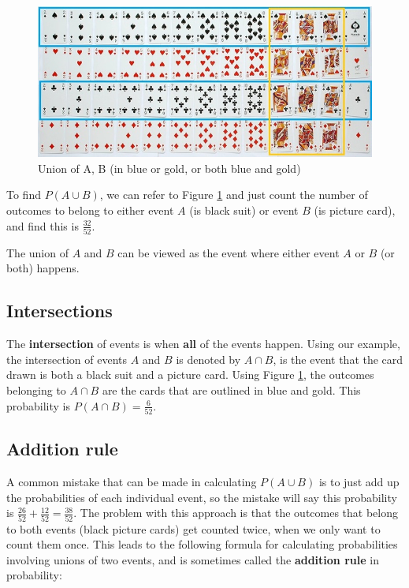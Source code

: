 \documentclass[
]{book}
\begin{document}
\begin{figure}
\centering
\includegraphics{images/02-cardsAB.jpg}
\caption{\label{fig:cardsAB}Union of A, B (in blue or gold, or both blue and gold)}
\end{figure}

To find \(P(A \cup B)\), we can refer to Figure \ref{fig:cardsAB} and just count the number of outcomes to belong to either event \(A\) (is black suit) or event \(B\) (is picture card), and find this is \(\frac{32}{52}\).

The union of \(A\) and \(B\) can be viewed as the event where either event \(A\) or \(B\) (or both) happens.

\subsection{Intersections}\label{intersections}

The \textbf{intersection} of events is when \textbf{all} of the events happen. Using our example, the intersection of events \(A\) and \(B\) is denoted by \(A \cap B\), is the event that the card drawn is both a black suit and a picture card. Using Figure \ref{fig:cardsAB}, the outcomes belonging to \(A \cap B\) are the cards that are outlined in blue and gold. This probability is \(P(A \cap B) = \frac{6}{52}\).

\subsection{Addition rule}\label{addition-rule}

A common mistake that can be made in calculating \(P(A \cup B)\) is to just add up the probabilities of each individual event, so the mistake will say this probability is \(\frac{26}{52} + \frac{12}{52} = \frac{38}{52}\). The problem with this approach is that the outcomes that belong to both events (black picture cards) get counted twice, when we only want to count them once. This leads to the following formula for calculating probabilities involving unions of two events, and is sometimes called the \textbf{addition rule} in probability:
\end{document}
